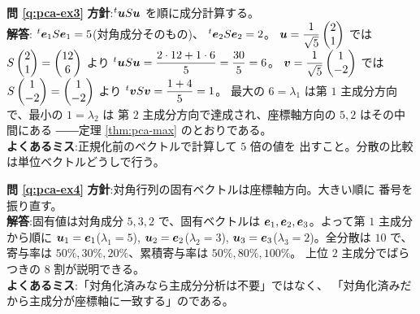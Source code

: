 \bigskip
\noindent\textbf{問 \ref{q:pca-ex3}}\quad
\textbf{方針}:${}^t\bm{u}S\bm{u}$ を順に成分計算する。\\
\textbf{解答}:
${}^t\bm{e}_1 S\bm{e}_1 = 5$(対角成分そのもの)、
${}^t\bm{e}_2 S\bm{e}_2 = 2$。
$\bm{u} = \dfrac{1}{\sqrt{5}}\begin{pmatrix}2 \\ 1\end{pmatrix}$ では
$S\begin{pmatrix}2 \\ 1\end{pmatrix} = \begin{pmatrix}12 \\ 6\end{pmatrix}$ より
${}^t\bm{u}S\bm{u} = \dfrac{2 \cdot 12 + 1 \cdot 6}{5}
= \dfrac{30}{5} = 6$。
$\bm{v} = \dfrac{1}{\sqrt{5}}\begin{pmatrix}1 \\ -2\end{pmatrix}$ では
$S\begin{pmatrix}1 \\ -2\end{pmatrix} = \begin{pmatrix}1 \\ -2\end{pmatrix}$ より
${}^t\bm{v}S\bm{v} = \dfrac{1 + 4}{5} = 1$。
最大の $6 = \lambda_1$ は第 $1$ 主成分方向で、最小の $1 = \lambda_2$ は
第 $2$ 主成分方向で達成され、座標軸方向の $5, 2$ はその中間にある
――定理 \ref{thm:pca-max} のとおりである。\\
\textbf{よくあるミス}:正規化前のベクトルで計算して $5$ 倍の値を
出すこと。分散の比較は単位ベクトルどうしで行う。

\bigskip
\noindent\textbf{問 \ref{q:pca-ex4}}\quad
\textbf{方針}:対角行列の固有ベクトルは座標軸方向。大きい順に
番号を振り直す。\\
\textbf{解答}:固有値は対角成分 $5, 3, 2$ で、固有ベクトルは
$\bm{e}_1, \bm{e}_2, \bm{e}_3$。よって第 $1$ 主成分から順に
$\bm{u}_1 = \bm{e}_1$($\lambda_1 = 5$),
$\bm{u}_2 = \bm{e}_2$($\lambda_2 = 3$),
$\bm{u}_3 = \bm{e}_3$($\lambda_3 = 2$)。全分散は $10$ で、
寄与率は $50\%, 30\%, 20\%$、累積寄与率は $50\%, 80\%, 100\%$。
上位 $2$ 主成分でばらつきの $8$ 割が説明できる。\\
\textbf{よくあるミス}:「対角化済みなら主成分分析は不要」ではなく、
「対角化済みだから主成分が座標軸に一致する」のである。
\bigskip

